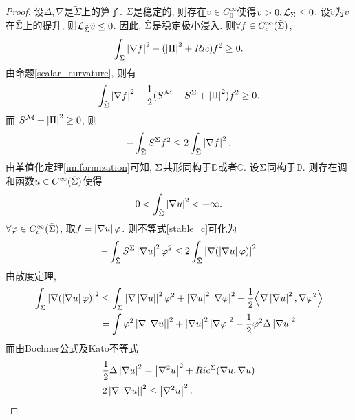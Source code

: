 \begin{proof}
    设$\Delta, \nabla$是$\tilde{\Sigma}$上的算子. $\Sigma$是稳定的, 则存在$v \in C_0^\infty$使得$v>0, \mathcal{L}_{\Sigma} \le 0$. 设$\tilde{v}$为$v$在${\tilde{\Sigma}}$上的提升, 则$\mathcal{L}_{{\tilde{\Sigma}}}\tilde{v}\le 0$. 因此, ${\tilde{\Sigma}}$是稳定极小浸入. 则$\forall f \in {C^\infty_c}({\tilde{\Sigma}})$,
    \begin{equation}
        \int_{\tilde{\Sigma}} \left | {\nabla} f \right |^2-(\left | {\Pi} \right |^2+Ric)f^2 \ge 0.
    \end{equation}
    由命题\eqref{scalar_curvature}, 则有
    \begin{equation}
        \int_{\tilde{\Sigma}} \left | {\nabla} f \right |^2-\frac{1}{2}(S^{\mathcal{M}}-S^\Sigma+\left | {\Pi} \right |^2)f^2 \ge 0.
    \end{equation}
    而 $S^{\mathcal{M}} +\left | {\Pi} \right |^2 \ge 0$, 则
    \begin{equation} \label{stable_c}
        -\int_{\tilde{\Sigma}} S^\Sigma f^2  \le 2\int_{\tilde{\Sigma}} \left | {\nabla} f \right |^2.
    \end{equation}
    由单值化定理\eqref{uniformization}可知,  ${\tilde{\Sigma}}$共形同构于$\mathbb{D}$或者$\mathbb{C}$. 设${\tilde{\Sigma}}$同构于$\mathbb{D}$. 则存在调和函数$u \in C^\infty({\tilde{\Sigma}})$使得
    \begin{equation}
        0< \int_{\tilde{\Sigma}} \left | \nabla u \right |^2  < +\infty.
    \end{equation}
    $\forall \varphi \in {C^\infty_c}({\tilde{\Sigma}})$,  取$f=\left | {\nabla} u \right |\varphi$. 则不等式\eqref{stable_c}可化为 
    \begin{equation}
        -\int_{\tilde{\Sigma}} S^\Sigma\left | {\nabla} u \right |^2\varphi^2 \le 2\int_{\tilde{\Sigma}} \left | {\nabla}(\left | {\nabla} u \right |\varphi) \right |^2
    \end{equation}
    由散度定理,
    \begin{equation}
        \begin{split}
            \int_{\tilde{\Sigma}} \left | {\nabla} (\left | {\nabla} u \right |\varphi) \right |^2 &\le \int_{\tilde{\Sigma}} \left | {\nabla}\left | {\nabla} u \right | \right |^2\varphi^2+\left | {\nabla} u \right |^2\left | {\nabla} \varphi \right |^2 + \frac{1}{2}{\left < {\nabla} \left | {\nabla} u \right |^2, {\nabla} \varphi^2 \right >} \\
            & = \int \varphi^2\left | {\nabla} \left | {\nabla} u \right | \right |^2 + \left | {\nabla} u \right |^2\left | {\nabla} \varphi \right |^2 - \frac{1}{2}\varphi^2\Delta \left | {\nabla} u \right |^2 
        \end{split}
    \end{equation}
    而由Bochner公式及Kato不等式
    \begin{align}
        &\frac{1}{2}\Delta \abs{\NT u}^2 = \abs{\NT^2 u}^2 + Ric^{\TS}(\NT u, \NT u) \\
        & 2\abs{\NT \abs{\NT u}}^2 \le \abs{\NT^2 u}^2.

\end{align}
\end{proof}
